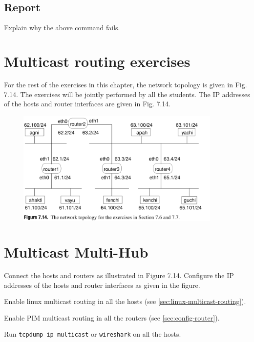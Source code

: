 \documentclass{../UTNetLab}
\begin{document}
    \subsection*{Report}
    Explain why the above command fails.

\section*{Multicast routing exercises}
    For the rest of the exercises in this chapter, the network topology is given in Fig. 7.14. The exercises will be jointly performed by all the students. The IP addresses of the hosts and router interfaces are given in Fig. 7.14.
    \begin{figure}[H]
        \centering
        \includegraphics[width=0.9\textwidth]{img/figure7-14.png}
        \label{fig:7.14}
    \end{figure}

\section{Multicast Multi-Hub}
    Connect the hosts and routers as illustrated in Figure 7.14.
    Configure the IP addresses of the hosts and router interfaces as given in the figure.


    Enable linux multicast routing in all the hosts (see \autoref{sec:linux-multicast-routing}).

    Enable PIM multicast routing in all the routers (see \autoref{sec:config-router}). 

    Run \lstinline{tcpdump ip multicast} or \lstinline{wireshark} on all the hosts. 
\end{document}
